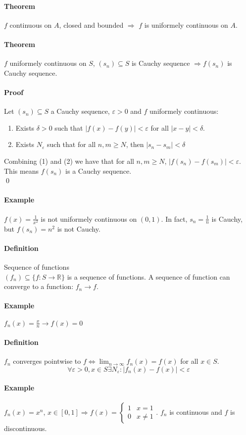 \documentclass{article}
\newcommand{\DS}{\displaystyle}
\newcommand{\abs}[1]{\left|#1\right|}
\newcommand{\func}[3]{#1 : #2 \rightarrow #3}
\newcommand{\limn}{\lim_{n \to \infty}}
\newcommand{\intcc}[1]{\left[#1\right]}
\newcommand{\R}{\mathbb{R}}
\newcommand{\Ep}{\varepsilon}
\newcommand{\Def}{\paragraph{Definition}}
\newcommand{\Theorem}{\paragraph{Theorem}}
\newcommand{\Proof}{\paragraph{Proof}}
\newcommand{\Example}{\paragraph{Example}}
\begin{document}
  \Theorem $f$ continuous on $A$, closed and bounded $\Rightarrow$ $f$ is
  uniformely continuous on $A$.

  \Theorem $f$ uniformely continuous on $S$, $(s_n) \subseteq S$ is Cauchy
  sequence $\Rightarrow f(s_n)$ is Cauchy sequence.

  \Proof Let $(s_n) \subseteq S$ a Cauchy sequence, $\Ep > 0$ and $f$ uniformely
  continuous:
\begin{enumerate}
  \item Exists $\delta > 0$ such that $\abs{f(x)-f(y)} < \Ep$ for all $\abs{x-y}
  < \delta$.
  \item Exists $N_\Ep$ such that for all $n,m \geq N$, then $\abs{s_n - s_m} <
  \delta$
\end{enumerate}
  Combining (1) and (2) we have that for all $n,m \geq N$, $\abs{f(s_n)-f(s_m)}
  < \Ep$. This means $f(s_n)$ is a Cauchy sequence.
\\\qed

  \Example $f(x) = \frac{1}{x^2}$ is not uniformely continuous on $(0,1)$. In
  fact, $s_n = \frac{1}{n}$ is Cauchy, but $f(s_n) = n^2$ is not Cauchy.

  \Def Sequence of functions
\\$(f_n) \subseteq \{ \func{f}{S}{\R} \}$ is a sequence of functions. A sequence
  of function can converge to a function: $f_n \to f$.

  \Example $f_n(x) = \frac{x}{n} \to f(x) = 0$

  \Def $f_n$ converges pointwise to $f \iff \DS \limn{f_n(x)} = f(x)$ for all
  $x \in S$.
\begin{equation*}
  \forall \Ep > 0, x \in S \exists N_\Ep : \abs{f_n(x) - f(x)} < \Ep
\end{equation*}

  \Example $f_n(x) = x^n$, $x \in \intcc{0,1} \Rightarrow f(x) =
  \begin{cases}1 & x = 1 \\ 0 & x \neq 1\end{cases}$. $f_n$ is continuous and
  $f$ is discontinuous.
\end{document}
